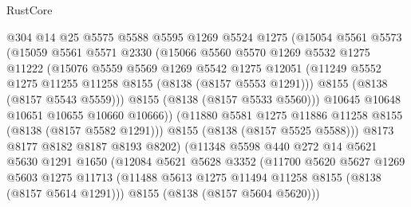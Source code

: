 \begin{lexlean}{RustCore}
\begin{coremodule}
                        @304
                        @14
                        @25
                        @5575
                        @5588
                        @5595
                        @1269
                        @5524
                        @1275
                        (@15054
                          @5561
                          @5573
                          (@15059
                            @5561
                            @5571
                            @2330
                            (@15066
                              @5560
                              @5570
                              @1269
                              @5532
                              @1275
                              @11222
                              (@15076
                                @5559
                                @5569
                                @1269
                                @5542
                                @1275
                                @12051
                                (@11249 @5552 @1275 @11255 @11258 @8155 (@8138 (@8157 @5553 @1291)))
                                @8155
                                (@8138 (@8157 @5543 @5559)))
                              @8155
                              (@8138 (@8157 @5533 @5560)))
                            @10645
                            @10648
                            @10651
                            @10655
                            @10660
                            @10666))
                        (@11880 @5581 @1275 @11886 @11258 @8155 (@8138 (@8157 @5582 @1291)))
                        @8155
                        (@8138 (@8157 @5525 @5588)))
                      @8173
                      @8177
                      @8182
                      @8187
                      @8193
                      @8202)
                    (@11348
                      @5598
                      @440
                      @272
                      @14
                      @5621
                      @5630
                      @1291
                      @1650
                      (@12084
                        @5621
                        @5628
                        @3352
                        (@11700
                          @5620
                          @5627
                          @1269
                          @5603
                          @1275
                          @11713
                          (@11488 @5613 @1275 @11494 @11258 @8155 (@8138 (@8157 @5614 @1291)))
                          @8155
                          (@8138 (@8157 @5604 @5620)))

\end{coremodule}
\end{lexlean}
